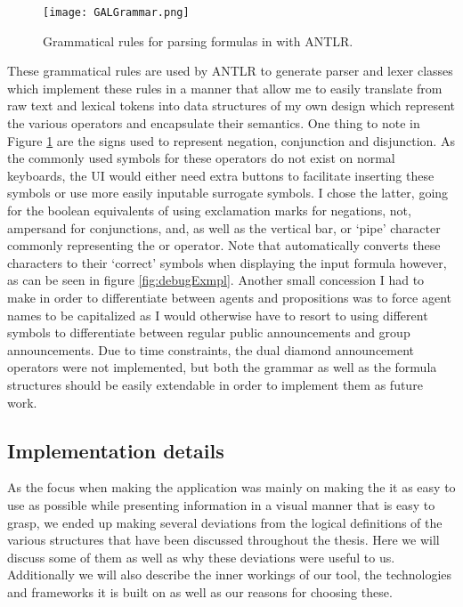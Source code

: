 \begin{figure}[h]
	\label{fig:grammar}
	\caption{Grammatical rules for parsing formulas in \cname with ANTLR. }
	\texttt{[image: GALGrammar.png]}
\end{figure}

These grammatical rules are used by ANTLR to generate parser and lexer classes which implement these rules in a manner that allow me to easily translate from raw text and lexical tokens into data structures of my own design which represent the various operators and encapsulate their semantics. One thing to note in Figure \ref{fig:grammar} are the signs used to represent negation, conjunction and disjunction. As the commonly used symbols for these operators do not exist on normal keyboards, the UI would either need extra buttons to facilitate inserting these symbols or use more easily inputable surrogate symbols. I chose the latter, going for the boolean equivalents of using exclamation marks for negations, not, ampersand for conjunctions, and, as well as the vertical bar, or `pipe' character commonly representing the or operator. Note that \cname automatically converts these characters to their `correct' symbols when displaying the input formula however, as can be seen in figure \ref{fig:debugExmpl}. 
Another small concession I had to make in order to differentiate between agents and propositions was to force agent names to be capitalized as I would otherwise have to resort to using different symbols to differentiate between regular public announcements and group announcements. Due to time constraints, the dual diamond announcement operators were not implemented, but both the grammar as well as the formula structures should be easily extendable in order to implement them as future work.

\subsection{Implementation details}

As the focus when making the application was mainly on making the it as easy to use as possible while presenting information in a visual manner that is easy to grasp, we ended up making several deviations from the logical definitions of the various structures that have been discussed throughout the thesis. Here we will discuss some of them as well as why these deviations were useful to us. Additionally we will also describe the inner workings of our tool, the technologies and frameworks it is built on as well as our reasons for choosing these.

